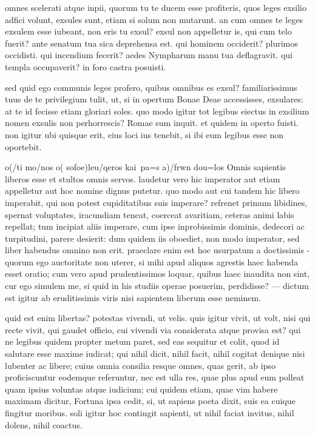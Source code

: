  omnes scelerati atque inpii, quorum tu te ducem esse profiteris, quos leges exsilio adfici volunt, exsules sunt, etiam si solum non mutarunt. an cum omnes te leges exsulem esse iubeant, non eris tu exsul? exsul non appelletur is, qui cum telo fuerit? ante senatum tua sica deprehensa est. qui hominem occiderit? plurimos occidisti. qui incendium fecerit? aedes Nympharum manu tua deflagravit. qui templa occupaverit? in foro castra posuisti.

 sed quid ego communis leges profero, quibus omnibus es exsul? familiarissimus tuus de te privilegium tulit, ut, si in opertum Bonae Deae accessisses, exsulares: at te id fecisse etiam gloriari soles. quo modo igitur tot legibus eiectus in exsilium nomen exsulis non perhorrescis? Romae sum inquit. et quidem in operto fuisti. non igitur ubi quisque erit, eius loci ius tenebit, si ibi eum legibus esse non oportebit.

 o(/ti mo/nos o( sofo\s e)leu/qeros kai\ pa=s a)/frwn dou=los Omnis sapientis liberos esse et stultos omnis servos. laudetur vero hic imperator aut etiam appelletur aut hoc nomine dignus putetur. quo modo aut cui tandem hic libero imperabit, qui non potest cupiditatibus suis imperare? refrenet primum libidines, spernat voluptates, iracundiam teneat, coerceat avaritiam, ceteras animi labis repellat; tum incipiat aliis imperare, cum ipse inprobissimis dominis, dedecori ac turpitudini, parere desierit: dum quidem iis oboediet, non modo imperator, sed liber habendus omnino non erit. praeclare enim est hoc usurpatum a doctissimis - quorum ego auctoritate non uterer, si mihi apud aliquos agrestis haec habenda esset oratio; cum vero apud prudentissimos loquar, quibus haec inaudita non sint, cur ego simulem me, si quid in his studiis operae posuerim, perdidisse? — dictum est igitur ab eruditissimis viris nisi sapientem liberum esse neminem.

 quid est enim libertas? potestas vivendi, ut velis. quis igitur vivit, ut volt, nisi qui recte vivit, qui gaudet officio, cui vivendi via considerata atque provisa est? qui ne legibus quidem propter metum paret, sed eas sequitur et colit, quod id salutare esse maxime iudicat; qui nihil dicit, nihil facit, nihil cogitat denique nisi lubenter ac libere; cuius omnia consilia resque omnes, quas gerit, ab ipso proficiscuntur eodemque referuntur, nec est ulla res, quae plus apud eum polleat quam ipsius voluntas atque iudicium; cui quidem etiam, quae vim habere maximam dicitur, Fortuna ipsa cedit, si, ut sapiens poeta dixit, suis ea cuique fingitur moribus. soli igitur hoc contingit sapienti, ut nihil faciat invitus, nihil dolens, nihil coactus.

